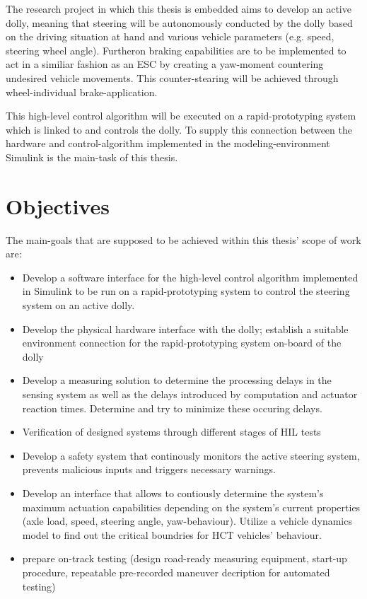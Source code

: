 \documentclass[ExampleMasters.tex]{subfiles}
\begin{document}
The research project in which this thesis is embedded aims to develop an active dolly, meaning that steering will be autonomously conducted by the dolly based on the driving situation at hand and various vehicle parameters (e.g. speed, steering wheel angle). Furtheron braking capabilities are to be implemented to act in a similiar fashion as an \gls{ESC} by creating a yaw-moment countering undesired vehicle movements. This counter-stearing will be achieved through wheel-individual brake-application. 

This high-level control algorithm will be executed on a rapid-prototyping system which is linked to and controls the dolly. To supply this connection between the hardware and control-algorithm implemented in the modeling-environment Simulink is the main-task of this thesis.    

\section{Objectives}
\label{sec:objectives}
The main-goals that are supposed to be achieved within this thesis' scope of work are: 

\begin{itemize}
	\item{Develop a software interface for the high-level control algorithm implemented in Simulink to be run on a rapid-prototyping system to control the steering system on an active dolly. }
	\item{Develop the physical hardware interface with the dolly; establish a suitable environment connection for the rapid-prototyping system on-board of the dolly} 
	\item{Develop a measuring solution to determine the processing delays in the sensing system as well as the delays introduced by computation and actuator reaction times. Determine and try to minimize these occuring delays.}  
	\item{Verification of designed systems through different stages of \gls{HIL} tests}
	\item{Develop a safety system that continously monitors the active steering system, prevents malicious inputs and triggers necessary warnings.}
	\item{Develop an interface that allows to contiously determine the system's maximum actuation capabilities depending on the system's current properties (axle load, speed, steering angle, yaw-behaviour). Utilize a vehicle dynamics model to find out the critical boundries for \gls{HCT} vehicles' behaviour.}	
	\item{prepare on-track testing (design road-ready measuring equipment, start-up procedure, repeatable pre-recorded maneuver decription for automated testing)}
	
\end{itemize}
\end{document}
